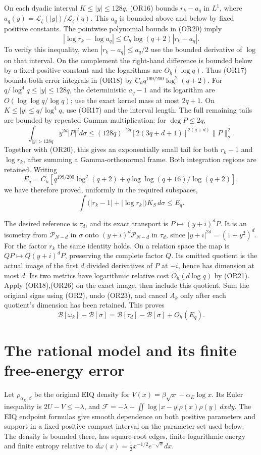 \documentclass[11pt]{article}
\newcommand{\PP}{\mathcal P}
\newcommand{\BB}{\mathcal B}
\begin{document}
On each dyadic interval \(K\leq |y|\leq128q\), (OR16) bounds
\(r_k-a_q\) in \(L^1\), where
\(a_q(y)=\mathcal L_\zeta(|y|)/\mathcal L_\zeta(q)\).
This \(a_q\) is bounded above and below by fixed positive constants.
The pointwise polynomial bounds in (OR20) imply
\[
 |\log r_k-\log a_q|\leq C_h\log(q+2)|r_k-a_q|.
 \tag{OR24}
\]
To verify this inequality, when \(|r_k-a_q|\leq a_q/2\) use the
bounded derivative of \(\log\) on that interval.  On the complement
the right-hand difference is bounded below by a fixed positive
constant and the logarithms are \(O_h(\log q)\).
Thus (OR17) bounds both error integrals in (OR18) by
\(C_hq^{199/200}\log^2(q+2)\).
For \(q/\log^4q\leq|y|\leq128q\), the deterministic \(a_q-1\)
and its logarithm are \(O(\log\log q/\log q)\); use the exact
kernel mass at most \(2q+1\).  On
\(K\leq|y|\leq q/\log^4q\), use (OR17) and the interval length.
The full remaining tails are bounded by repeated Gamma
multiplication: for \(\deg P\leq2q\),
\[
 \int_{|y|>128q} y^{2d}|P|^2d\sigma
 \leq (128q)^{-2q}[2(3q+d+1)]^{2(q+d)}\|P\|_\sigma^2 .
 \tag{OR25}
\]
Together with (OR20), this gives an exponentially small tail for
both \(r_k-1\) and \(\log r_k\), after summing a Gamma-orthonormal
frame.  Both integration regions are retained.
Writing
\[
 E_q=C_h\left[q^{199/200}\log^2(q+2)
       +q\log\log(q+16)/\log(q+2)\right],
\]
we have therefore proved, uniformly in the required subspaces,
\[
 \int\bigl(|r_k-1|+|\log r_k|\bigr)K_S\,d\sigma\leq E_q.
 \tag{OR26}
\]

The desired reference is \(\tau_d\), and its exact transport is
\(P\mapsto(y+i)^dP\).  It is an isometry from
\(\PP_{N-d}\) in \(\sigma\) onto
\((y+i)^d\PP_{N-d}\) in \(\tau_d\), since
\(|y+i|^{2d}=(1+y^2)^d\).
For the factor \(r_k\) the same identity holds.  On a relation
space the map is \(QP\mapsto Q(y+i)^dP\), preserving the complete
factor \(Q\).  Its omitted quotient is the actual image of
the first \(d\) divided derivatives of \(P\) at \(-i\), hence has
dimension at most \(d\).  Its two metrics have logarithmic
relative cost \(O_h(d\log q)\) by (OR21).
Apply (OR18),(OR26) on the exact image, then include this quotient.
Sum the original signs using (OR2), undo (OR23), and cancel \(A_k\)
only after each quotient's dimension has been retained.  This proves
\[
 \BB[\omega_k]-\BB[\sigma]
 =\BB[\tau_d]-\BB[\sigma]+O_h(E_q).                  \tag{OR27}
\]

\section{The rational model and its finite free-energy error}
Let \(\rho_{\alpha_E,\beta}\) be the original EIQ density for
\(V(x)=\beta\sqrt x-\alpha_E\log x\).  Its Euler inequality is
\(2U-V\leq-\lambda\), and
\(\mathcal F=-\lambda-\iint\log|x-y|\rho(x)\rho(y)\,dxdy\).
The EIQ endpoint formulas give smooth dependence on both positive
parameters and support in a fixed positive compact interval on
the parameter set used below.  The density is bounded there,
has square-root edges, finite logarithmic energy and finite
entropy relative to
\(d\omega(x)=\tfrac12x^{-1/2}e^{-\sqrt x}dx\).
\end{document}
